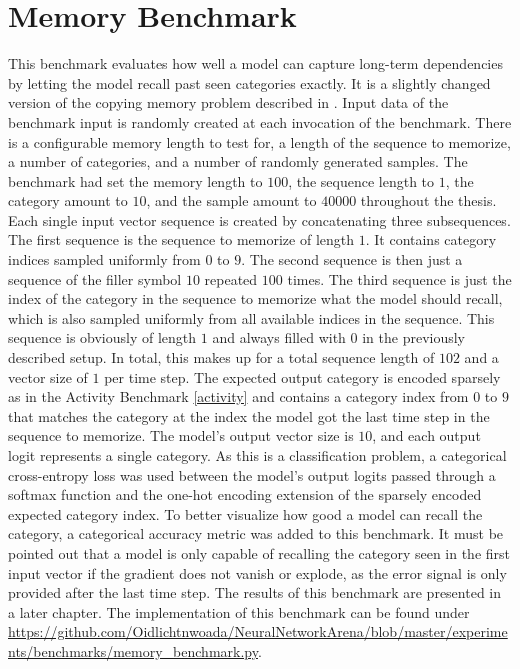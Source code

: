 \documentclass[draft,final]{vutinfth} %
\begin{document}
\section{Memory Benchmark} \label{memory}
This benchmark evaluates how well a model can capture long-term dependencies by letting the model recall past seen categories exactly.
It is a slightly changed version of the copying memory problem described in \cite{UnitaryRNNs}.
Input data of the benchmark input is randomly created at each invocation of the benchmark.
There is a configurable memory length to test for, a length of the sequence to memorize, a number of categories, and a number of randomly generated samples.
The benchmark had set the memory length to $100$, the sequence length to $1$, the category amount to $10$, and the sample amount to $40000$ throughout the thesis.
Each single input vector sequence is created by concatenating three subsequences.
The first sequence is the sequence to memorize of length $1$.
It contains category indices sampled uniformly from $0$ to $9$.
The second sequence is then just a sequence of the filler symbol $10$ repeated $100$ times.
The third sequence is just the index of the category in the sequence to memorize what the model should recall, which is also sampled uniformly from all available indices in the sequence.
This sequence is obviously of length $1$ and always filled with $0$ in the previously described setup.
In total, this makes up for a total sequence length of $102$ and a vector size of $1$ per time step.
The expected output category is encoded sparsely as in the Activity Benchmark \ref{activity} and contains a category index from $0$ to $9$ that matches the category at the index the model got the last time step in the sequence to memorize.
The model's output vector size is $10$, and each output logit represents a single category.
As this is a classification problem, a categorical cross-entropy loss was used between the model's output logits passed through a softmax function and the one-hot encoding extension of the sparsely encoded expected category index.
To better visualize how good a model can recall the category, a categorical accuracy metric was added to this benchmark.
It must be pointed out that a model is only capable of recalling the category seen in the first input vector if the gradient does not vanish or explode, as the error signal is only provided after the last time step.
The results of this benchmark are presented in a later chapter.
The implementation of this benchmark can be found under \url{https://github.com/Oidlichtnwoada/NeuralNetworkArena/blob/master/experiments/benchmarks/memory_benchmark.py}.
\end{document}
